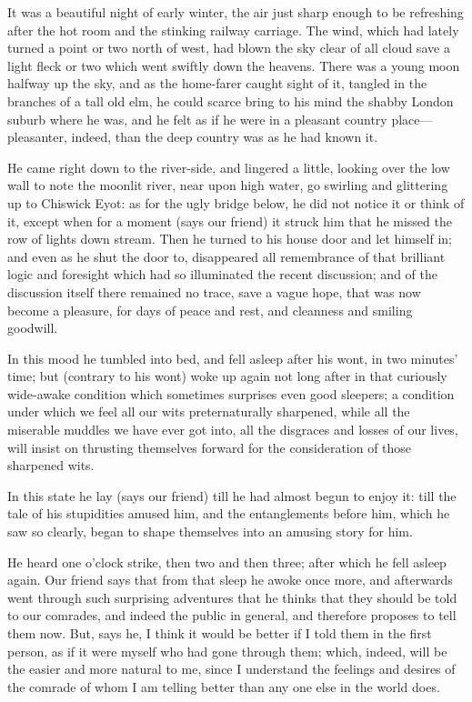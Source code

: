 It was a beautiful night of early winter, the air just sharp enough to
be refreshing after the hot room and the stinking railway carriage. The
wind, which had lately turned a point or two north of west, had blown
the sky clear of all cloud save a light fleck or two which went swiftly
down the heavens. There was a young moon halfway up the sky, and as the
home-farer caught sight of it, tangled in the branches of a tall old
elm, he could scarce bring to his mind the shabby London suburb where he
was, and he felt as if he were in a pleasant country place---pleasanter,
indeed, than the deep country was as he had known it.

He came right down to the river-side, and lingered a little, looking
over the low wall to note the moonlit river, near upon high water, go
swirling and glittering up to Chiswick Eyot: as for the ugly bridge
below, he did not notice it or think of it, except when for a moment
(says our friend) it struck him that he missed the row of lights down
stream. Then he turned to his house door and let himself in; and even as
he shut the door to, disappeared all remembrance of that brilliant logic
and foresight which had so illuminated the recent discussion; and of the
discussion itself there remained no trace, save a vague hope, that was
now become a pleasure, for days of peace and rest, and cleanness and
smiling goodwill.

In this mood he tumbled into bed, and fell asleep after his wont, in two
minutes' time; but (contrary to his wont) woke up again not long after
in that curiously wide-awake condition which sometimes surprises even
good sleepers; a condition under which we feel all our wits
preternaturally sharpened, while all the miserable muddles we have ever
got into, all the disgraces and losses of our lives, will insist on
thrusting themselves forward for the consideration of those sharpened
wits.

In this state he lay (says our friend) till he had almost begun to enjoy
it: till the tale of his stupidities amused him, and the entanglements
before him, which he saw so clearly, began to shape themselves into an
amusing story for him.

He heard one o'clock strike, then two and then three; after which he
fell asleep again. Our friend says that from that sleep he awoke once
more, and afterwards went through such surprising adventures that he
thinks that they should be told to our comrades, and indeed the public
in general, and therefore proposes to tell them now. But, says he, I
think it would be better if I told them in the first person, as if it
were myself who had gone through them; which, indeed, will be the easier
and more natural to me, since I understand the feelings and desires of
the comrade of whom I am telling better than any one else in the world
does.
